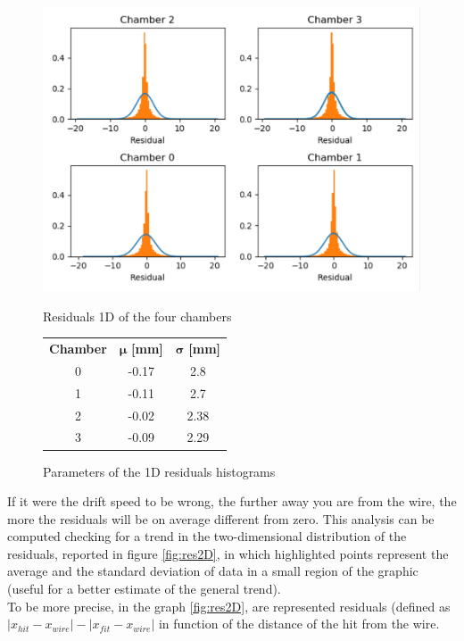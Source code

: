 \documentclass[a4paper,11pt]{book}
\begin{document}
\begin{figure}[hbtp]
\begin{minipage}[c]{0.6\textwidth}
\centering
\includegraphics[scale=0.6]{pictures/Residuals_1D.pdf}
\caption{Residuals 1D of the four chambers}
\label{fig:res1D}
\end{minipage}\quad
\begin{minipage}[c]{0.4\textwidth}
\begin{tabular}{c | c  c}
\toprule
 \textbf{Chamber} & $\bm{\mu}$\textbf{ [mm]} & $\bm{\sigma}$\textbf{ [mm]}\\
0 & -0.17 & 2.8\\
1 & -0.11 & 2.7\\
2 & -0.02 & 2.38\\
3 &-0.09  & 2.29\\
\bottomrule
\end{tabular}
\caption{Parameters of the 1D residuals histograms}
\label{tab:res1D}
\end{minipage}
\end{figure}

If it were the drift speed to be wrong, the further away you are from the wire, the more the residuals will be on average different from zero. This analysis can be computed checking for a trend in the two-dimensional distribution of the residuals, reported in figure \ref{fig:res2D}, in which highlighted points represent the average and the standard deviation of data in a small region of the graphic (useful for a better estimate of the general trend).\\
To be more precise, in the graph \ref{fig:res2D}, are represented residuals (defined as $|x_{hit}-x_{wire}|-|x_{fit}-x_{wire}|$ in function of the distance of the hit from the wire.\\
\end{document}
